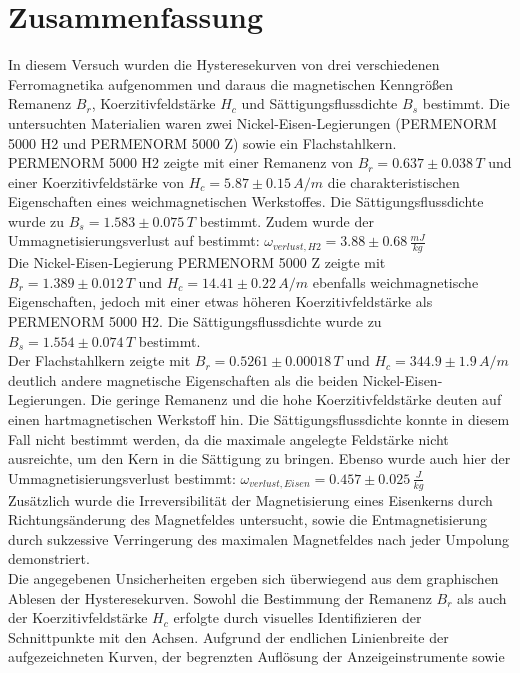 \section{Zusammenfassung}
In diesem Versuch wurden die Hysteresekurven von drei verschiedenen Ferromagnetika aufgenommen und
daraus die magnetischen Kenngrößen Remanenz $B_r$, Koerzitivfeldstärke $H_c$ und Sättigungsflussdichte $B_s$ bestimmt.
Die untersuchten Materialien waren zwei Nickel-Eisen-Legierungen (PERMENORM 5000 H2 und PERMENORM 5000 Z)
sowie ein Flachstahlkern. \\
PERMENORM 5000 H2 zeigte mit einer Remanenz von $B_r = 0.637 \pm 0.038 \, T$ und einer Koerzitivfeldstärke
von $H_c = 5.87 \pm 0.15 \, A/m$ die charakteristischen Eigenschaften eines weichmagnetischen Werkstoffes.
Die Sättigungsflussdichte wurde zu $B_s = 1.583 \pm 0.075 \, T$ bestimmt. 
Zudem wurde der Ummagnetisierungsverlust auf bestimmt: $\omega_{verlust, H2} = 3.88 \pm 0.68 \, \frac{mJ}{kg}$\\
Die Nickel-Eisen-Legierung PERMENORM 5000 Z zeigte mit $B_r = 1.389 \pm 0.012 \, T$ und
$H_c = 14.41 \pm 0.22 \, A/m$ ebenfalls weichmagnetische Eigenschaften, jedoch mit einer etwas
höheren Koerzitivfeldstärke als PERMENORM 5000 H2. Die Sättigungsflussdichte wurde zu
$B_s = 1.554 \pm 0.074 \, T$ bestimmt. \\
Der Flachstahlkern zeigte mit $B_r = 0.5261 \pm 0.00018 \, T$ und $H_c = 344.9 \pm 1.9 \, A/m$
deutlich andere magnetische Eigenschaften als die beiden Nickel-Eisen-Legierungen. Die
geringe Remanenz und die hohe Koerzitivfeldstärke deuten auf einen hartmagnetischen Werkstoff hin.
Die Sättigungsflussdichte konnte in diesem Fall nicht bestimmt werden, da die maximale
angelegte Feldstärke nicht ausreichte, um den Kern in die Sättigung zu bringen. 
Ebenso wurde auch hier der Ummagnetisierungsverlust bestimmt: $\omega_{verlust, Eisen} = 0.457 \pm 0.025 \, \frac{J}{kg}$\\
Zusätzlich wurde die Irreversibilität der Magnetisierung eines Eisenkerns durch Richtungsänderung
des Magnetfeldes untersucht, sowie die Entmagnetisierung durch sukzessive Verringerung
des maximalen Magnetfeldes nach jeder Umpolung demonstriert. \\
Die angegebenen Unsicherheiten ergeben sich überwiegend aus dem
graphischen Ablesen der Hysteresekurven. Sowohl die Bestimmung der
Remanenz \( B_r \) als auch der Koerzitivfeldstärke \( H_c \)
erfolgte durch visuelles Identifizieren der Schnittpunkte mit den
Achsen. Aufgrund der endlichen Linienbreite der aufgezeichneten
Kurven, der begrenzten Auflösung der Anzeigeinstrumente sowie
